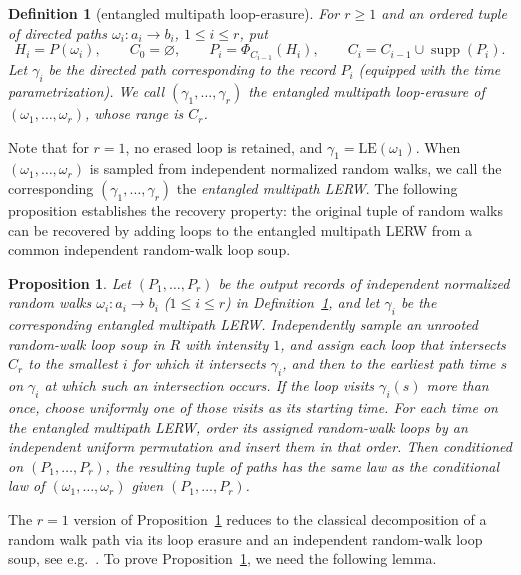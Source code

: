 \documentclass[11pt]{article}
\numberwithin{equation}{section}
\newcommand{\1}{\mathbf{1}}
\newcommand{\LE}{\mathrm{LE}}
\newtheorem{definition}[theorem]{Definition}
\newtheorem{proposition}[theorem]{Proposition}
\newcommand{\supp}{\operatorname{supp}}
\begin{document}
\begin{definition}[entangled multipath loop-erasure]\label{def:entangled}
For $r\ge1$ and an ordered tuple of directed paths $\omega_i:a_i\to b_i$, $1\le i\le r$, put
\begin{equation}\label{eq:sequential-reduction}
 H_i=P(\omega_i),\qquad C_0=\varnothing,\qquad
 P_i=\Phi_{C_{i-1}}(H_i),\qquad
 C_i=C_{i-1}\cup\supp(P_i).
\end{equation}
Let $\gamma_i$ be the directed path corresponding to the record $P_i$ (equipped with the time parametrization).  We call $(\gamma_1,\ldots,\gamma_r)$
the entangled multipath loop-erasure of $(\omega_1,\ldots,\omega_r)$, whose range is $C_r$.
\end{definition}

Note that for $r=1$, no erased loop is retained, and $\gamma_1=\LE(\omega_1)$. When $(\omega_1,\ldots,\omega_r)$ is sampled from independent normalized random walks, we call the corresponding $(\gamma_1,\ldots,\gamma_r)$ the \emph{entangled multipath LERW}.
The following proposition establishes the recovery property: the original tuple of random walks can be recovered by adding loops to the entangled multipath LERW from a common independent random-walk loop soup.


\begin{proposition}\label{prop:entangled-recovery}
Let $(P_1,\ldots,P_r)$ be the output records of independent normalized random walks
$\omega_i:a_i\to b_i$ ($1\le i\le r$) in Definition~\ref{def:entangled}, and let $\gamma_i$ be the corresponding
 entangled multipath LERW.  Independently sample an unrooted random-walk loop soup in $R$ with intensity $1$, and assign each loop that intersects $C_r$ to the smallest $i$ for which
it intersects $\gamma_i$, and then to the earliest path time $s$ on $\gamma_i$
at which such an intersection occurs.  If the loop visits $\gamma_i(s)$ more than once, choose uniformly one of those visits as its starting time. For each time on the entangled multipath LERW, order its assigned random-walk loops by an independent
uniform permutation and insert them in that order. Then conditioned on
$(P_1,\ldots,P_r)$, the resulting tuple of paths has the same law as the conditional law of $(\omega_1,\ldots,\omega_r)$ given $(P_1,\ldots,P_r)$.
\end{proposition}

The $r=1$ version of Proposition~\ref{prop:entangled-recovery} reduces to the classical decomposition of a random walk path via its loop erasure and an independent random-walk loop soup, see e.g.~\cite[Proposition 5.9]{Lawler2018}.
To prove Proposition~\ref{prop:entangled-recovery}, we need the following lemma.
\end{document}
